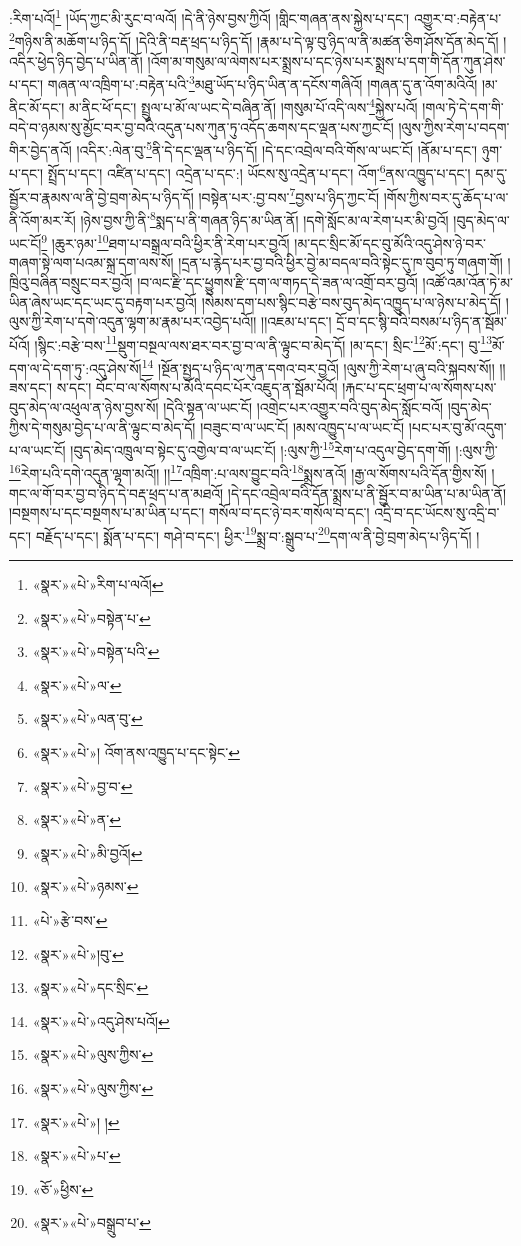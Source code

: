 :རིག་པའོ།\footnote{«སྣར་»«པེ་»རིག་པ་ལའོ།} །ཡོད་ཀྱང་མི་རུང་བ་ལའོ། །དེ་ནི་ཉེས་བྱས་ཀྱིའོ། །གླིང་གཞན་ནས་སྐྱེས་པ་དང་། འགྱུར་བ་:བརྟེན་པ་\footnote{«སྣར་»«པེ་»བསྟེན་པ་}གཉིས་ནི་མཆོག་པ་ཉིད་དོ། །དེའི་ནི་བརྡ་ཕྲད་པ་ཉིད་དོ། །རྣམ་པ་དེ་ལྟ་བུ་ཉིད་ལ་ནི་མཚན་ཅིག་ཤོས་དོན་མེད་དོ། །འདིར་ཕྱེད་ཉིད་བྱེད་པ་ཡིན་ནོ། །འོག་མ་གསུམ་ལ་ལེགས་པར་སྨྲས་པ་དང་ཉེས་པར་སྨྲས་པ་དག་གི་དོན་ཀུན་ཤེས་པ་དང་། གཞན་ལ་འཁྲིག་པ་:བརྟེན་པའི་\footnote{«སྣར་»«པེ་»བསྟེན་པའི་}མཐུ་ཡོད་པ་ཉིད་ཡིན་ན་དངོས་གཞིའོ། །གཞན་དུ་ན་འོག་མའིའོ། །མ་ནིང་མོ་དང་། མ་ནིང་ཕོ་དང་། སྤྲུལ་པ་མོ་ལ་ཡང་དེ་བཞིན་ནོ། །གསུམ་པོ་འདི་ལས་\footnote{«སྣར་»«པེ་»ལ་}སྐྱེས་པའོ། །གལ་ཏེ་དེ་དག་གི་བདེ་བ་ཉམས་སུ་མྱོང་བར་བྱ་བའི་འདུན་པས་ཀུན་ཏུ་འདོད་ཆགས་དང་ལྡན་པས་ཀྱང་ངོ། །ལུས་ཀྱིས་རེག་པ་བདག་གིར་བྱེད་ནའོ། །འདིར་:ལེན་བུ་\footnote{«སྣར་»«པེ་»ལན་བུ་}ནི་དེ་དང་ལྡན་པ་ཉིད་དོ། །དེ་དང་འབྲེལ་བའི་གོས་ལ་ཡང་ངོ། །ནོམ་པ་དང་། ཉུག་པ་དང་། སྤྲོད་པ་དང་། འཛིན་པ་དང་། འདྲེན་པ་དང་:། ཡོངས་སུ་འདྲེན་པ་དང་། འོག་\footnote{«སྣར་»«པེ་»།  འོག་ནས་འཁྱུད་པ་དང་སྟེང་}ནས་འཁྱུད་པ་དང་། དམ་དུ་སྦྱོར་བ་རྣམས་ལ་ནི་བྱེ་བྲག་མེད་པ་ཉིད་དོ། །བསྟེན་པར་:བྱ་བས་\footnote{«སྣར་»«པེ་»བྱ་བ་}བྱས་པ་ཉིད་ཀྱང་ངོ། །གོས་ཀྱིས་བར་དུ་ཆོད་པ་ལ་ནི་འོག་མར་རོ། །ཉེས་བྱས་ཀྱི་ནི་\footnote{«སྣར་»«པེ་»ན་}སྨད་པ་ནི་གཞན་ཉིད་མ་ཡིན་ནོ། །དགེ་སློང་མ་ལ་རེག་པར་མི་བྱའོ། །བུད་མེད་ལ་ཡང་ངོ།\footnote{«སྣར་»«པེ་»མི་བྱའོ།} །ཆུར་ཉམ་\footnote{«སྣར་»«པེ་»ཉམས་}ཐག་པ་བསྒྲལ་བའི་ཕྱིར་ནི་རེག་པར་བྱའོ། །མ་དང་སྲིང་མོ་དང་བུ་མོའི་འདུ་ཤེས་ཉེ་བར་གཞག་སྟེ་ལག་པའམ་སྐྲ་དག་ལས་སོ། །དྲན་པ་རྙེད་པར་བྱ་བའི་ཕྱིར་བྱེ་མ་བདལ་བའི་སྟེང་དུ་ཁ་བུབ་ཏུ་གཞག་གོ། །ཁྲིའུ་བཞིན་བསྲུང་བར་བྱའོ། །བ་ལང་རྫི་དང་ཕྱུགས་རྫི་དག་ལ་གཏད་དེ་ཟན་ལ་འགྲོ་བར་བྱའོ། །འཚོ་འམ་འོན་ཏེ་མ་ཡིན་ཞེས་ཡང་དང་ཡང་དུ་བརྟག་པར་བྱའོ། །སེམས་དག་པས་སྙིང་བརྩེ་བས་བུད་མེད་འཁྱུད་པ་ལ་ཉེས་པ་མེད་དོ། །ལུས་ཀྱི་རེག་པ་དགེ་འདུན་ལྷག་མ་རྣམ་པར་འབྱེད་པའོ།། །།འཇམ་པ་དང་། དྲོ་བ་དང་སྙི་བའི་བསམ་པ་ཉིད་ན་སྦོམ་པོའོ། །སྙིང་:བརྩེ་བས་\footnote{«པེ་»རྩེ་བས་}སྡུག་བསྔལ་ལས་ཐར་བར་བྱ་བ་ལ་ནི་ལྟུང་བ་མེད་དོ། །མ་དང་། སྲིང་\footnote{«སྣར་»«པེ་»།བུ་}མོ་:དང་། བུ་\footnote{«སྣར་»«པེ་»དང་སྲིང་}མོ་དག་ལ་དེ་དག་ཏུ་:འདུ་ཤེས་སོ།\footnote{«སྣར་»«པེ་»འདུ་ཤེས་པའོ།} །སྔོན་སྤྱད་པ་ཉིད་ལ་ཀུན་དགའ་བར་བྱའོ། །ལུས་ཀྱི་རེག་པ་ཞུ་བའི་སྐབས་སོ།། །།ཟས་དང་། ས་དང་། བོང་བ་ལ་སོགས་པ་མོའི་དབང་པོར་འཇུད་ན་སྦོམ་པོའོ། །རྐང་པ་དང་ཕྲག་པ་ལ་སོགས་པས་བུད་མེད་ལ་འཕུལ་ན་ཉེས་བྱས་སོ། །དེའི་སྟན་ལ་ཡང་ངོ། །འགྲེང་པར་འགྱུར་བའི་བུད་མེད་སློང་བའོ། །བུད་མེད་ཀྱིས་དེ་གསུམ་བྱེད་པ་ལ་ནི་ལྟུང་བ་མེད་དོ། །བཟུང་བ་ལ་ཡང་ངོ། །མས་འཁྱུད་པ་ལ་ཡང་ངོ། །པང་པར་བུ་མོ་འདུག་པ་ལ་ཡང་ངོ། །བུད་མེད་འཁྲུལ་བ་སྟེང་དུ་འགྱེལ་བ་ལ་ཡང་ངོ། །:ལུས་ཀྱི་\footnote{«སྣར་»«པེ་»ལུས་ཀྱིས་}རེག་པ་འདུལ་བྱེད་དག་གོ། །:ལུས་ཀྱི་\footnote{«སྣར་»«པེ་»ལུས་ཀྱིས་}རེག་པའི་དགེ་འདུན་ལྷག་མའོ།། །།\footnote{«སྣར་»«པེ་»། །}འཁྲིག་:པ་ལས་བྱུང་བའི་\footnote{«སྣར་»«པེ་»པ་}སྨྲས་ནའོ། །རྒྱ་ལ་སོགས་པའི་དོན་གྱིས་སོ། །གང་ལ་གོ་བར་བྱ་བ་ཉིད་དེ་བརྡ་ཕྲད་པ་ན་མཐའོ། །དེ་དང་འབྲེལ་བའི་དོན་སྨྲས་པ་ནི་སྦྱོར་བ་མ་ཡིན་པ་མ་ཡིན་ནོ། །བསྔགས་པ་དང་བསྔགས་པ་མ་ཡིན་པ་དང་། གསོལ་བ་དང་ཉེ་བར་གསོལ་བ་དང་། འདྲི་བ་དང་ཡོངས་སུ་འདྲི་བ་དང་། བརྗོད་པ་དང་། སྨོན་པ་དང་། གཤེ་བ་དང་། ཕྱིར་\footnote{«ཅོ་»ཕྱིས་}སྨྲ་བ་:སྒྲུབ་པ་\footnote{«སྣར་»«པེ་»བསྒྲུབ་པ་}དག་ལ་ནི་བྱེ་བྲག་མེད་པ་ཉིད་དོ། །
